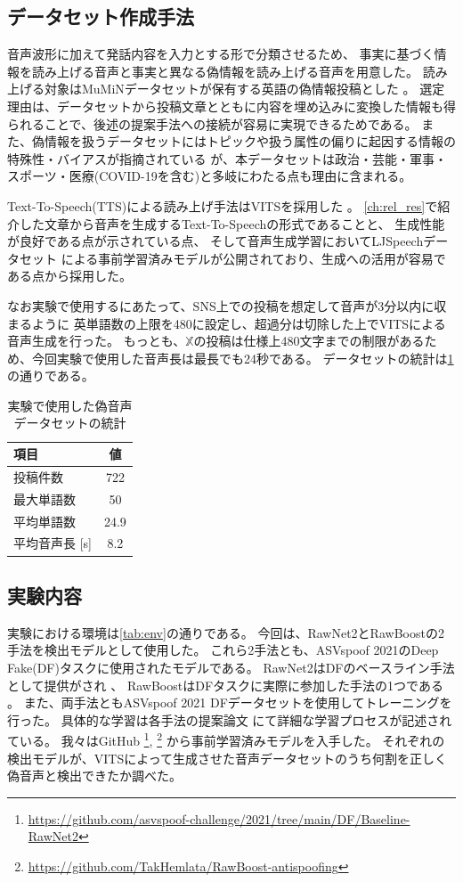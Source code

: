 \subsection{データセット作成手法}\label{ssc:spc_ds}
音声波形に加えて発話内容を入力とする形で分類させるため、
事実に基づく情報を読み上げる音声と事実と異なる偽情報を読み上げる音声を用意した。
読み上げる対象はMuMiNデータセットが保有する英語の偽情報投稿とした \cite{10.1145/3477495.3531744}。
選定理由は、データセットから投稿文章とともに内容を埋め込みに変換した情報も得られることで、後述の提案手法への接続が容易に実現できるためである。
また、偽情報を扱うデータセットにはトピックや扱う属性の偏りに起因する情報の特殊性・バイアスが指摘されている \cite{10.1145/3477495.3531816}が、本データセットは政治・芸能・軍事・スポーツ・医療(COVID-19を含む)と多岐にわたる点も理由に含まれる。

Text-To-Speech(TTS)による読み上げ手法はVITSを採用した \cite{pmlr-v139-kim21f}。
\cref{ch:rel_res}で紹介した文章から音声を生成するText-To-Speechの形式であることと、
生成性能が良好である点が示されている点、
そして音声生成学習においてLJSpeechデータセット \cite{ljspeech17}による事前学習済みモデルが公開されており、生成への活用が容易である点から採用した。

なお実験で使用するにあたって、SNS上での投稿を想定して音声が3分以内に収まるように
英単語数の上限を480に設定し、超過分は切除した上でVITSによる音声生成を行った。
もっとも、$\mathbb{X}$の投稿は仕様上480文字までの制限があるため、今回実験で使用した音声長は最長でも24秒である。
データセットの統計は\cref{tb:dataset}の通りである。

\begin{table}[p]
    \centering
    \caption{実験で使用した偽音声データセットの統計}
    \begin{tabular}{lc}\hline
        項目 & 値\\\hline\hline
        投稿件数 & 722\\
        最大単語数 & 50\\
        平均単語数 & 24.9\\
        平均音声長 [\si{s}] & 8.2\\\hline
    \end{tabular}
    \label{tb:dataset}
\end{table}

\subsection{実験内容}
実験における環境は\ref{tab:env}の通りである。
今回は、RawNet2とRawBoostの2手法を検出モデルとして使用した。
これら2手法とも、ASVspoof 2021のDeep Fake(DF)タスクに使用されたモデルである。
RawNet2はDFのベースライン手法として提供がされ \cite{yamagishi21_asvspoof}、
RawBoostはDFタスクに実際に参加した手法の1つである \cite{9746213}。
また、両手法ともASVspoof 2021 DFデータセットを使用してトレーニングを行った。
具体的な学習は各手法の提案論文 \cite{9414234,9746213}にて詳細な学習プロセスが記述されている。
我々はGitHub \footnote{\url{https://github.com/asvspoof-challenge/2021/tree/main/DF/Baseline-RawNet2}}, 
\footnote{\url{https://github.com/TakHemlata/RawBoost-antispoofing}}
から事前学習済みモデルを入手した。
それぞれの検出モデルが、VITSによって生成させた音声データセットのうち何割を正しく偽音声と検出できたか調べた。

